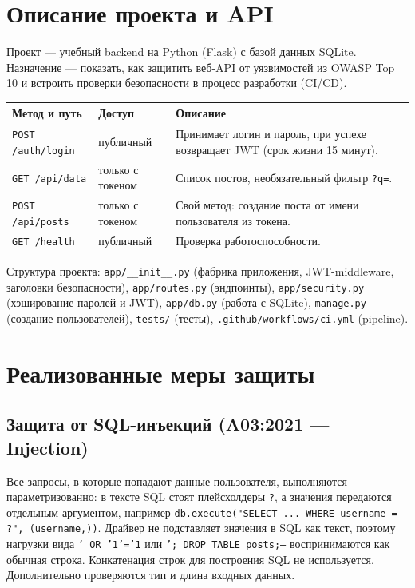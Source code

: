\documentclass[12pt,a4paper]{article}
\newcommand{\code}[1]{\texttt{\small #1}}
\begin{document}
\section{Описание проекта и API}
Проект --- учебный backend на Python (Flask) с базой данных SQLite. Назначение --- показать, как защитить веб-API от
уязвимостей из OWASP Top 10 и встроить проверки безопасности в процесс разработки (CI/CD).

\begin{table}[H]
\centering\small
\begin{tabular}{llp{7.2cm}}
\toprule
Метод и путь & Доступ & Описание \\
\midrule
\code{POST /auth/login} & публичный & Принимает логин и пароль, при успехе возвращает JWT (срок жизни 15 минут). \\
\code{GET /api/data} & только с токеном & Список постов, необязательный фильтр \code{?q=}. \\
\code{POST /api/posts} & только с токеном & Свой метод: создание поста от имени пользователя из токена. \\
\code{GET /health} & публичный & Проверка работоспособности. \\
\bottomrule
\end{tabular}
\end{table}

Структура проекта: \code{app/\_\_init\_\_.py} (фабрика приложения, JWT-middleware, заголовки безопасности),
\code{app/routes.py} (эндпоинты), \code{app/security.py} (хэширование паролей и JWT), \code{app/db.py} (работа с SQLite),
\code{manage.py} (создание пользователей), \code{tests/} (тесты), \code{.github/workflows/ci.yml} (pipeline).

\section{Реализованные меры защиты}

\subsection{Защита от SQL-инъекций (A03:2021 --- Injection)}
Все запросы, в которые попадают данные пользователя, выполняются параметризованно: в тексте SQL стоят плейсхолдеры \code{?},
а значения передаются отдельным аргументом, например
\code{db.execute("SELECT ... WHERE username = ?", (username,))}. Драйвер не подставляет значения в SQL как текст, поэтому
нагрузки вида \code{' OR '1'='1} или \code{'; DROP TABLE posts;--} воспринимаются как обычная строка. Конкатенация строк для
построения SQL не используется. Дополнительно проверяются тип и длина входных данных.
\end{document}
